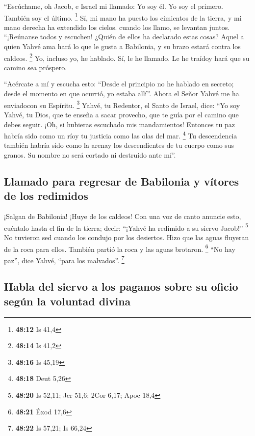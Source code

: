  ``Escúchame, oh Jacob, e Israel mi llamado: Yo soy él.
Yo soy el primero. También soy el último. \footnote{\textbf{48:12} Is
  41,4}  Sí, mi mano ha puesto los cimientos de la
tierra, y mi mano derecha ha extendido los cielos. cuando los llamo, se
levantan juntos.  ``¡Reúnanse todos y escuchen! ¿Quién de
ellos ha declarado estas cosas? Aquel a quien Yahvé ama hará lo que le
gusta a Babilonia, y su brazo estará contra los caldeos. \footnote{\textbf{48:14}
  Is 41,2}  Yo, incluso yo, he hablado. Sí, le he
llamado. Le he traídoy hará que su camino sea próspero.

 ``Acércate a mí y escucha esto: ``Desde el principio no
he hablado en secreto; desde el momento en que ocurrió, yo estaba
allí''. Ahora el Señor Yahvé me ha enviadocon su Espíritu. \footnote{\textbf{48:16}
  Is 45,19}  Yahvé, tu Redentor, el Santo de Israel,
dice: ``Yo soy Yahvé, tu Dios, que te enseña a sacar provecho, que te
guía por el camino que debes seguir.  ¡Oh, si hubieras
escuchado mis mandamientos! Entonces tu paz habría sido como un ríoy tu
justicia como las olas del mar. \footnote{\textbf{48:18} Deut 5,26}
 Tu descendencia también habría sido como la arenay los
descendientes de tu cuerpo como sus granos. Su nombre no será cortado ni
destruido ante mí''.

\hypertarget{llamado-para-regresar-de-babilonia-y-vuxedtores-de-los-redimidos}{%
\subsection{Llamado para regresar de Babilonia y vítores de los
redimidos}\label{llamado-para-regresar-de-babilonia-y-vuxedtores-de-los-redimidos}}

 ¡Salgan de Babilonia! ¡Huye de los caldeos! Con una voz
de canto anuncie esto, cuéntalo hasta el fin de la tierra; decir:
``¡Yahvé ha redimido a su siervo Jacob!'' \footnote{\textbf{48:20} Is
  52,11; Jer 51,6; 2Cor 6,17; Apoc 18,4}  No tuvieron sed
cuando los condujo por los desiertos. Hizo que las aguas fluyeran de la
roca para ellos. También partió la roca y las aguas brotaron.
\footnote{\textbf{48:21} Éxod 17,6}  ``No hay paz'', dice
Yahvé, ``para los malvados''. \footnote{\textbf{48:22} Is 57,21; Is
  66,24}

\hypertarget{habla-del-siervo-a-los-paganos-sobre-su-oficio-seguxfan-la-voluntad-divina}{%
\subsection{Habla del siervo a los paganos sobre su oficio según la
voluntad
divina}\label{habla-del-siervo-a-los-paganos-sobre-su-oficio-seguxfan-la-voluntad-divina}}

